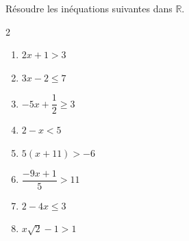 \begin{exo}{}
	Résoudre les inéquations suivantes dans $\mathbb{R}$.
	\vspace*{-2mm}\begin{multicols}{2}
		\begin{enumerate}[itemsep=2mm]
			\item $2x + 1 > 3$
			\item $3x - 2 \leqslant 7$
			\item $-5x + \dfrac{1}{2} \geqslant 3$
			\item $2 - x < 5$
			\item $5(x + 11) > -6$
			\item \vspace*{2mm} $\dfrac{-9x + 1}{5} > 11$
			\item $2 - 4x \leqslant 3$
			\item $x\sqrt{2} - 1 > 1$
		\end{enumerate}
	\end{multicols}
\end{exo}
